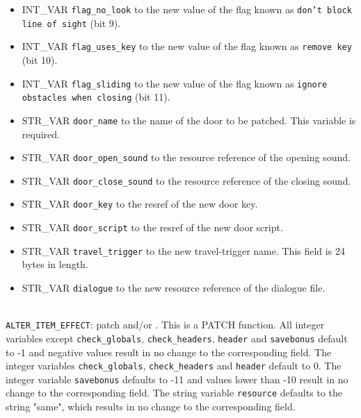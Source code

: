 \documentclass{article}
\def\t#1{{\tt #1}}
\begin{document}
\begin{itemize}
\item INT_VAR \verb+flag_no_look+ to the new value of the flag known as \t{don't block line of sight} (bit 9).
\item INT_VAR \verb+flag_uses_key+ to the new value of the flag known as \t{remove key} (bit 10).
\item INT_VAR \verb+flag_sliding+ to the new value of the flag known as \t{ignore obstacles when closing} (bit 11).
\item STR_VAR \verb+door_name+ to the name of the door to be patched. This variable is required.
\item STR_VAR \verb+door_open_sound+ to the resource reference of the opening sound.
\item STR_VAR \verb+door_close_sound+ to the resource reference of the closing sound.
\item STR_VAR \verb+door_key+ to the resref of the new door key.
\item STR_VAR \verb+door_script+ to the resref of the new door script.
\item STR_VAR \verb+travel_trigger+ to the new travel-trigger name. This field is 24 bytes in length.
\item STR_VAR \verb+dialogue+ to the new resource reference of the dialogue file.
\end{itemize}
\\

\verb+ALTER_ITEM_EFFECT+: patch  and/or . This is a PATCH function. All integer variables except \verb+check_globals+, \verb+check_headers+, \verb+header+ and \verb+savebonus+ default to -1 and negative values result in no change to the corresponding field. The integer variables \verb+check_globals+, \verb+check_headers+ and \verb+header+ default to 0. The integer variable \verb+savebonus+ defaults to -11 and values lower than -10 result in no change to the corresponding field. The string variable \verb+resource+ defaults to the string "same", which results in no change to the corresponding field.
\end{document}
